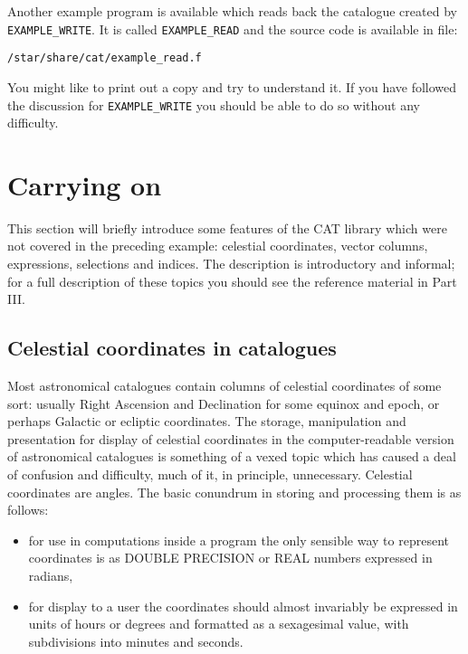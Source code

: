 Another example program is available which reads back the catalogue
created by {\tt EXAMPLE\_WRITE}. It is called {\tt EXAMPLE\_READ}
and the source code is available in file:

\begin{center}
{\tt /star/share/cat/example\_read.f}
\end{center}

You might like to print out a copy and try to understand it. If you
have followed the discussion for {\tt EXAMPLE\_WRITE} you should be
able to do so without any difficulty.


\section{Carrying on}

This section will briefly introduce some features of the CAT library
which were not covered in the preceding example: celestial coordinates,
vector columns, expressions, selections and indices. The description is
introductory and informal; for a full description of these topics you
should see the reference material in Part III.


\subsection{Celestial coordinates in catalogues}

Most astronomical catalogues contain columns of celestial
coordinates of some sort: usually Right Ascension and
Declination for some equinox and epoch, or perhaps Galactic or
ecliptic coordinates. The storage, manipulation and presentation
for display of celestial coordinates in the computer-readable
version of astronomical catalogues is something of a vexed topic
which has caused a deal of confusion and difficulty, much of it,
in principle, unnecessary. Celestial coordinates are angles. The
basic conundrum in storing and processing them is as follows:

\begin{itemize}

  \item for use in computations inside a program the only
  sensible way to represent coordinates is as DOUBLE PRECISION or
  REAL numbers expressed in radians,

  \item for display to a user the coordinates should almost
   invariably be expressed in units of hours or degrees and
   formatted as a sexagesimal value, with subdivisions into minutes
   and seconds.

\end{itemize}

